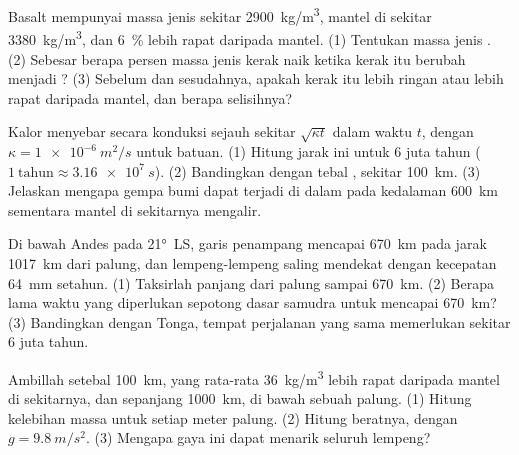 \begin{exercise}[$\star\star$]\label{exo:g11:subduction-zones:11}
Basalt  mempunyai massa jenis sekitar \qty{2900}{kg/m^3}, mantel
di sekitar  \qty{3380}{kg/m^3}, dan  \qty{6}{\percent} lebih
rapat daripada mantel. (1) Tentukan massa jenis . (2) Sebesar berapa
persen massa jenis kerak naik ketika kerak itu berubah menjadi ?
(3) Sebelum dan sesudahnya, apakah kerak itu lebih ringan atau lebih rapat
daripada mantel, dan berapa selisihnya?
\end{exercise}

\begin{exercise}[$\star\star\star$]\label{exo:g11:subduction-zones:12}
Kalor menyebar secara konduksi sejauh sekitar $\sqrt{\kappa t}$ dalam waktu $t$,
dengan $\kappa = \qty{1e-6}{m^2/s}$ untuk batuan. (1) Hitung jarak ini untuk 6
juta tahun ($1~\text{tahun} \approx \qty{3.16e7}{s}$). (2) Bandingkan dengan tebal
, sekitar \qty{100}{km}. (3) Jelaskan mengapa gempa bumi dapat terjadi
di dalam  pada kedalaman \qty{600}{km} sementara mantel di sekitarnya
mengalir.
\end{exercise}

\begin{exercise}[$\star\star\star$]\label{exo:g11:subduction-zones:13}
Di bawah Andes pada \ang{21}~LS, garis penampang mencapai \qty{670}{km} pada
jarak \qty{1017}{km} dari palung, dan lempeng-lempeng saling mendekat dengan
kecepatan \qty{64}{mm} setahun. (1) Taksirlah panjang  dari palung
sampai \qty{670}{km}. (2) Berapa lama waktu yang diperlukan sepotong dasar
samudra untuk mencapai \qty{670}{km}? (3) Bandingkan dengan Tonga, tempat
perjalanan yang sama memerlukan sekitar 6 juta tahun.
\end{exercise}

\begin{exercise}[$\star\star\star$]\label{exo:g11:subduction-zones:14}
Ambillah  setebal \qty{100}{km}, yang rata-rata \qty{36}{kg/m^3} lebih
rapat daripada mantel di sekitarnya, dan sepanjang \qty{1000}{km}, di bawah
sebuah palung. (1) Hitung kelebihan massa  untuk setiap meter palung.
(2) Hitung beratnya, dengan $g = \qty{9.8}{m/s^2}$. (3) Mengapa gaya ini dapat
menarik seluruh lempeng?
\end{exercise}

